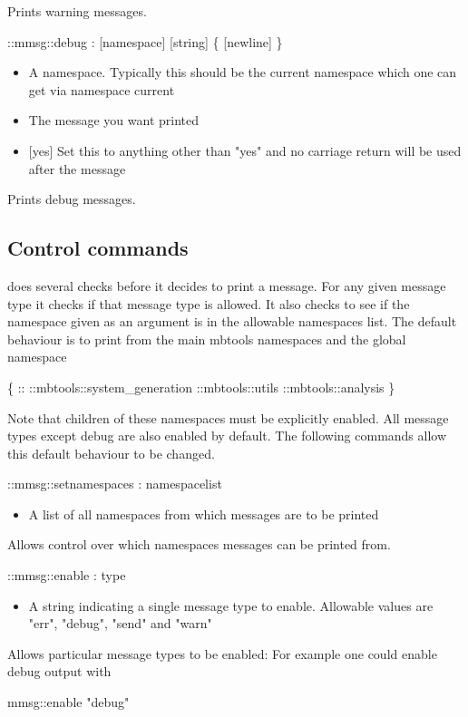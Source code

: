 Prints warning messages.
\begin{code} 
  ::mmsg::debug : [namespace] [string] \{ [newline] \}
\end{code}
\begin{itemize}
          \item {} A namespace. Typically this should be the current namespace which one can get via namespace current
          \item {} The message you want printed
          \item {} [yes] Set this to anything other than "yes" and no carriage return will be used after the message
\end{itemize}
Prints debug messages.

\subsection{Control commands}

 does several checks before it decides to print a message. For any given message type it checks if that message type is allowed. It also checks to see if the namespace given as an argument is in the allowable namespaces list. The default behaviour is to print from the main mbtools namespaces and the global namespace

\begin{code}
  \{ :: ::mbtools::system_generation ::mbtools::utils ::mbtools::analysis \}
\end{code}
  
Note that children of these namespaces must be explicitly enabled. All message types except debug are also enabled by default. The following commands allow this default behaviour to be changed.

\begin{code} 
  ::mmsg::setnamespaces : namespacelist
\end{code}
\begin{itemize}
          \item {} A list of all namespaces from which messages are to be printed
\end{itemize}
Allows control over which namespaces messages can be printed from.
\begin{code}     
  ::mmsg::enable : type
\end{code}
\begin{itemize}
          \item {} A string indicating a single message type to enable. Allowable values are "err", "debug", "send" and "warn"
\end{itemize}
Allows particular message types to be enabled: For example one could enable debug output with
\begin{code}
       mmsg::enable "debug" 
\end{code}

